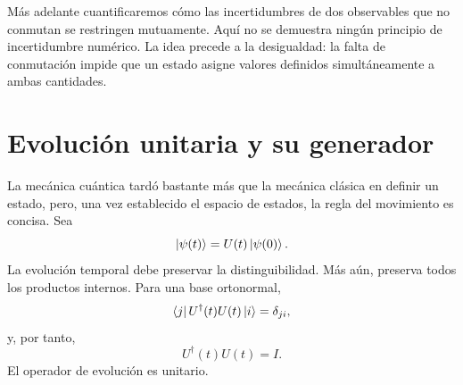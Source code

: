 Más adelante cuantificaremos cómo las incertidumbres de dos observables que no conmutan se restringen mutuamente. Aquí no se demuestra ningún principio de incertidumbre numérico. La idea precede a la desigualdad: la falta de conmutación impide que un estado asigne valores definidos simultáneamente a ambas cantidades.

\begin{classroomqa}\end{classroomqa}

\begin{classroomqa}\end{classroomqa}

\section{Evolución unitaria y su generador}

La mecánica cuántica tardó bastante más que la mecánica clásica en definir un estado, pero, una vez establecido el espacio de estados, la regla del movimiento es concisa. Sea
\begin{equation}
\left\lvert\psi(t)\right\rangle=U(t)\left\lvert\psi(0)\right\rangle.
\label{eq:l5-propagator}
\end{equation}
La evolución temporal debe preservar la distinguibilidad. Más aún, preserva todos los productos internos. Para una base ortonormal,
\begin{equation}
\left\langle j\right\rvert U^\dagger(t)U(t)\left\lvert i\right\rangle=\delta_{ji},
\end{equation}
y, por tanto,
\begin{equation}
U^\dagger(t)U(t)=I.
\label{eq:l5-unitarity}
\end{equation}
El operador de evolución es unitario.

